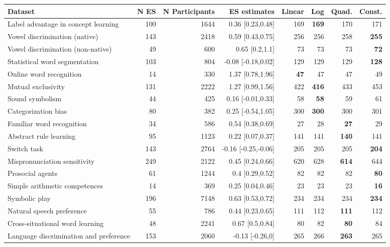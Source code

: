 \documentclass[10pt, letterpaper]{article}
\begin{document}
\begin{table}[ht]
\begin{tabular}{l|r|r|r|r|r|r|r}

\hline
\textbf{Dataset} & N ES & N Participants & ES estimates & Linear & Log & Quad. & Const.\\
\hline
Label advantage in concept learning & 100 & 1644 & 0.36 [0.23,0.48] & 169 & \textbf{169} & 170 & 171\\
Vowel discrimination (native) & 143 & 2418 & 0.59 [0.43,0.75] & 256 & 256 & 258 & \textbf{255}\\
Vowel discrimination (non-native) & 49 & 600 & 0.65 [0.2,1.1] & 73 & 73 & 73 & \textbf{72}\\
Statistical word segmentation & 103 & 804 & -0.08 [-0.18,0.02] & 129 & 129 & 129 & \textbf{128}\\
Online word recognition & 14 & 330 & 1.37 [0.78,1.96] & \textbf{47} & 47 & 47 & 49\\
Mutual exclusivity & 131 & 2222 & 1.27 [0.99,1.56] & 422 & \textbf{416} & 433 & 453\\
Sound symbolism & 44 & 425 & 0.16 [-0.01,0.33] & 58 & \textbf{58} & 59 & 61\\
Categorization bias & 80 & 382 & 0.25 [-0.54,1.05] & 300 & \textbf{300} & 300 & 301\\
Familiar word recognition & 34 & 586 & 0.54 [0.38,0.69] & 27 & 28 & \textbf{27} & 29\\
Abstract rule learning & 95 & 1123 & 0.22 [0.07,0.37] & 141 & 141 & \textbf{140} & 141\\
Switch task & 143 & 2764 & -0.16 [-0.25,-0.06] & 205 & 205 & 205 & \textbf{204}\\
Mispronunciation sensitivity & 249 & 2122 & 0.45 [0.24,0.66] & 620 & 628 & \textbf{614} & 644\\
Prosocial agents & 61 & 1244 & 0.4 [0.29,0.52] & 82 & 82 & 82 & \textbf{80}\\
Simple arithmetic competences & 14 & 369 & 0.25 [0.04,0.46] & 23 & 23 & 23 & \textbf{16}\\
Symbolic play & 196 & 7148 & 0.63 [0.53,0.72] & 234 & 234 & 234 & \textbf{234}\\
Natural speech preference & 55 & 786 & 0.44 [0.23,0.65] & 111 & 112 & \textbf{111} & 112\\
Cross-situational word learning & 48 & 2241 & 0.67 [0.5,0.84] & 80 & 82 & \textbf{80} & 84\\
Language discrimination and preference & 153 & 2060 & -0.13 [-0.26,0] & 265 & 266 & \textbf{263} & 265\\

\end{tabular}
\end{table}
\end{document}
